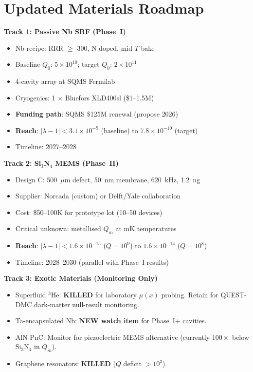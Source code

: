 \documentclass[11pt]{article}
\theoremstyle{definition}
\theoremstyle{remark}
\newcommand{\ee}[1]{\times 10^{#1}}
\newcommand{\lam}{|\lambda-1|}
\begin{document}
\section{Updated Materials Roadmap}
\label{sec:roadmap}

\begin{tcolorbox}[colback=green!5!white, colframe=green!50!black,
  title=\textbf{DFD Materials Roadmap --- W4i10 Update}]

\textbf{Track 1: Passive Nb SRF (Phase~I)}
\begin{itemize}[nosep]
\item Nb recipe: RRR $\geq$ 300, N-doped, mid-$T$ bake
\item Baseline $Q_0$: $5\ee{10}$; target $Q_0$: $2\ee{11}$
\item 4-cavity array at SQMS Fermilab
\item Cryogenics: 1 $\times$ Bluefors XLD400sl (\$1--1.5M)
\item \textbf{Funding path}: SQMS \$125M renewal (propose 2026)
\item \textbf{Reach}: $\lam < 3.1\ee{-9}$ (baseline) to $7.8\ee{-10}$ (target)
\item Timeline: 2027--2028
\end{itemize}

\textbf{Track 2: Si$_3$N$_4$ MEMS (Phase~II)}
\begin{itemize}[nosep]
\item Design C: 500~$\mu$m defect, 50~nm membrane, 620~kHz, 1.2~ng
\item Supplier: Norcada (custom) or Delft/Yale collaboration
\item Cost: \$50--100K for prototype lot (10--50 devices)
\item Critical unknown: metallised $Q_m$ at mK temperatures
\item \textbf{Reach}: $\lam < 1.6\ee{-15}$ ($Q = 10^9$) to $1.6\ee{-14}$ ($Q = 10^8$)
\item Timeline: 2028--2030 (parallel with Phase~I results)
\end{itemize}

\textbf{Track 3: Exotic Materials (Monitoring Only)}
\begin{itemize}[nosep]
\item Superfluid $^3$He: \textbf{KILLED} for laboratory $\mu(x)$ probing.
  Retain for QUEST-DMC dark-matter null-result monitoring.
\item Ta-encapsulated Nb: \textbf{NEW watch item} for Phase~I+ cavities.
\item AlN PnC: Monitor for piezoelectric MEMS alternative
  (currently $100\times$ below Si$_3$N$_4$ in $Q_m$).
\item Graphene resonators: \textbf{KILLED} ($Q$ deficit $>10^3$).
\end{itemize}
\end{tcolorbox}
\end{document}

